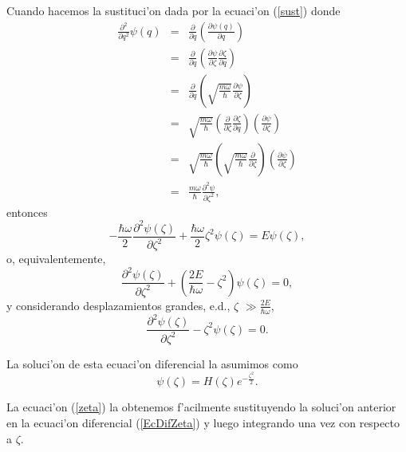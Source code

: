 Cuando hacemos la sustituci'on dada por la ecuaci'on (\ref{sust}) donde
\begin{eqnarray}
\frac{\partial^{2}}{\partial q^{2}}\psi\left( q\right) & = &\frac{\partial
}{\partial q}\left( \frac{\partial\psi\left( q\right) }{\partial q}\right)
\\
& = &\frac{\partial}{\partial q}\left( \frac{\partial\psi}{\partial\zeta}
\frac{\partial\zeta}{\partial q}\right) \\
& = &\frac{\partial}{\partial q}\left( \sqrt{\frac{m\omega}{\hbar}}
\frac{\partial\psi}{\partial\zeta}\right) \\
& = &\sqrt{\frac{m\omega}{\hbar}}\left( \frac{\partial}{\partial\zeta}
\frac{\partial\zeta}{\partial q}\right) \left( \frac{\partial\psi}
{\partial\zeta}\right) \\
& = &\sqrt{\frac{m\omega}{\hbar}}\left( \sqrt{\frac{m\omega}{\hbar}}
\frac{\partial}{\partial\zeta}\right) \left( \frac{\partial\psi}
{\partial\zeta}\right) \\
& = &\frac{m\omega}{\hbar}\frac{\partial^{2}\psi}{\partial\zeta^{2}},
\end{eqnarray}
entonces
\begin{equation}
-\frac{\hbar\omega}{2}\frac{\partial^{2}\psi\left( \zeta\right) }
{\partial\zeta^{2}}+\frac{\hbar\omega}{2}\zeta^{2}\psi\left( \zeta\right)
=E\psi\left( \zeta\right),
\end{equation}
o, equivalentemente,
\begin{equation}
\frac{\partial^{2}\psi\left( \zeta\right) }{\partial\zeta^{2}}+\left(
\frac{2E}{\hbar\omega}-\zeta^{2}\right) \psi\left( \zeta\right) =0,
\end{equation} 
y considerando desplazamientos grandes, e.d., $\zeta$ $\gg\frac{2E}{\hbar\omega}$,
\begin{equation}
\frac{\partial^{2}\psi\left( \zeta\right) }{\partial\zeta^{2}}-\zeta^{2}%
\psi\left( \zeta\right) =0.\label{EcDifZeta}%
\end{equation}


La soluci'on de esta ecuaci'on diferencial la asumimos como
\begin{equation}
\psi\left( \zeta\right) =H\left( \zeta\right) e^{-\frac{\zeta^{2}}{2}}.
\end{equation}


La ecuaci'on (\ref{zeta}) la obtenemos f'acilmente sustituyendo la soluci'on
anterior en la ecuaci'on diferencial (\ref{EcDifZeta}) y luego integrando una vez
con respecto a $\zeta.$

